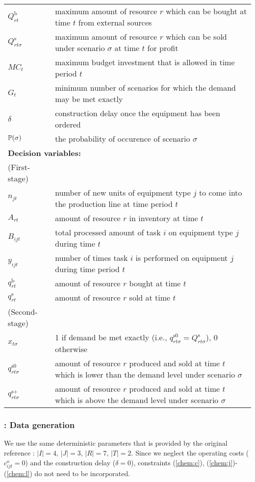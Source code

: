 \begin{table}[H]
{\begin{tabular}{ll}
			$Q_{rt}^\textrm{b}$ & maximum amount of resource $r$ which can be bought at time $t$ from external sources\\
			$Q_{rt\sigma}^\textrm{s}$ & maximum amount of resource $r$ which can be sold under scenario $\sigma$ at time $t$ for profit\\
			$MC_t$ & maximum budget investment that is allowed in time period $t$\\
			$G_t$ & minimum number of scenarios for which the demand may be met exactly \\
			$\delta$ & construction delay once the equipment has been ordered\\	
			$\operatorname*{\mathbb{P}}(\sigma)$ & \textrm{the probability of occurence of scenario $\sigma$} \\ \midrule
			\multicolumn{2}{l}{\textbf{Decision variables:}} \\
			\textrm{(First-stage)} \nonumber\\
			$n_{jt}$ & number of new units of equipment type $j$ to come into the production line at time period $t$\\
			$A_{rt}$ & amount of resource $r$ in inventory at time $t$\\
			$B_{ijt}$ & total processed amount of task $i$ on equipment type $j$ during time $t$\\
			$y_{ijt}$ & number of times task $i$ is performed on equipment $j$ during time period $t$\\
			$q_{rt}^\textrm{b}$ & amount of resource $r$ bought at time $t$\\
			$q_{rt}^\textrm{s}$ & amount of resource $r$ sold at time $t$\\
			\textrm{(Second-stage)} \nonumber\\
			$x_{t\sigma }$ & 1 if demand be met exactly (i.e., $q_{rt\sigma}^{\textrm{s0}}=Q_{rt\sigma}^{\textrm{s}}$), 0 otherwise\\				
			$q_{rt\sigma}^\textrm{s0}$ & amount of resource $r$ produced and sold at time $t$ which is lower than the demand level under scenario $\sigma$ \\
			$q_{rt\sigma}^\textrm{s+}$ & amount of resource $r$ produced and sold at time $t$ which is above the demand level under scenario $\sigma$ \\
			\bottomrule
		\end{tabular}
	}
\end{table} 

\subsubsection{\chem: Data generation}
We use the same deterministic parameters that is provided by the original reference \cite{journal:SPR1994}: $|I|=4$, $|J|=3$, $|R|=7$, $|T|=2$. Since we neglect the operating costs ($c_{ijt}^\textrm{o}=0$) and the construction delay ($\delta=0$), constraints (\ref{chem:c}), (\ref{chem:j})-(\ref{chem:l}) do not need to be incorporated. 

